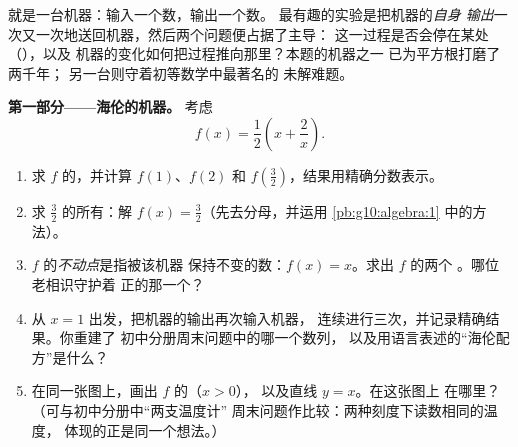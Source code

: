 \begin{problem}
\label{pb:g10:functions:1}
就是一台机器：输入一个数，输出一个数。
最有趣的实验是把机器的\emph{自身
输出}一次又一次地送回机器，然后两个问题便占据了主导：
这一过程是否会停在某处（\emph{}），以及
机器的变化如何把过程推向那里？本题的机器之一
已为平方根打磨了两千年；
另一台则守着初等数学中最著名的
未解难题。

\medskip
\noindent\textbf{第一部分——海伦的机器。}
考虑
\[
f(x) = \frac12\left(x + \frac2x\right).
\]
\begin{enumerate}
  \item 求 $f$ 的，并计算 $f(1)$、$f(2)$ 和
        $f\!\left(\frac32\right)$，结果用精确分数表示。
  \item 求 $\frac32$ 的所有：解
        $f(x) = \frac32$（先去分母，并运用
        \cref{pb:g10:algebra:1} 中的方法）。
  \item $f$ 的\emph{不动点}是指被该机器
        保持不变的数：$f(x) = x$。求出 $f$ 的两个
        。哪位老相识守护着
        正的那一个？
  \item 从 $x = 1$ 出发，把机器的输出再次输入机器，
        连续进行三次，并记录精确结果。你重建了
        初中分册周末问题中的哪一个数列，
        以及用语言表述的“海伦配方”是什么？
  \item 在同一张图上，画出 $f$ 的（$x > 0$），
        以及直线 $y = x$。在这张图上
        在哪里？（可与初中分册中“两支温度计”
        周末问题作比较：两种刻度下读数相同的温度，
        体现的正是同一个想法。）
\end{enumerate}


\end{problem}
